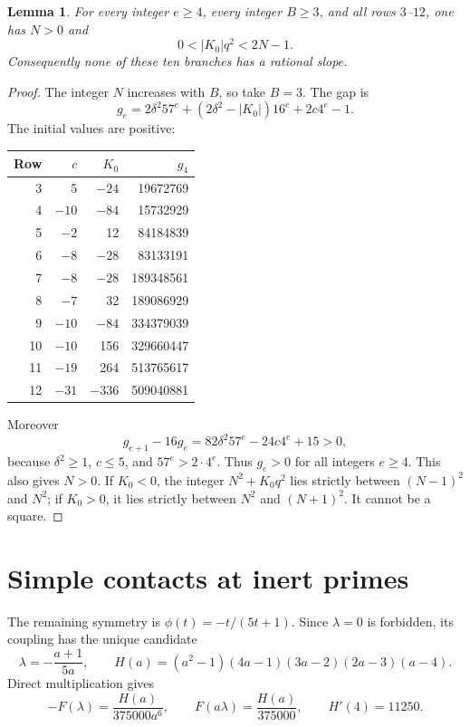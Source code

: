 \documentclass[11pt,a4paper]{article}
\newtheorem{lemma}[theorem]{Lemma}
\begin{document}
\begin{lemma}\label{lem:gap}
For every integer $e\ge4$, every integer $B\ge3$, and all rows
$3$--$12$, one has $N>0$ and
\[
                         0<|K_0|q^2<2N-1.
\]
Consequently none of these ten branches has a rational slope.
\end{lemma}
\begin{proof}
The integer $N$ increases with $B$, so take $B=3$. The gap is
\[
 g_e=2\delta^2 57^e+(2\delta^2-|K_0|)16^e+2c4^e-1.
\]
The initial values are positive:
\begin{center}
\begin{tabular}{rrrr}\toprule
Row&$c$&$K_0$&$g_4$\\\midrule
3&5&$-24$&19672769\\
4&$-10$&$-84$&15732929\\
5&$-2$&12&84184839\\
6&$-8$&$-28$&83133191\\
7&$-8$&$-28$&189348561\\
8&$-7$&32&189086929\\
9&$-10$&$-84$&334379039\\
10&$-10$&156&329660447\\
11&$-19$&264&513765617\\
12&$-31$&$-336$&509040881\\\bottomrule
\end{tabular}
\end{center}
Moreover
\[
        g_{e+1}-16g_e=82\delta^2 57^e-24c4^e+15>0,
\]
because $\delta^2\ge1$, $c\le5$, and $57^e>2\cdot4^e$.
Thus $g_e>0$ for all integers $e\ge4$. This also gives $N>0$.
If $K_0<0$, the integer $N^2+K_0q^2$ lies strictly between
$(N-1)^2$ and $N^2$; if $K_0>0$, it lies strictly between
$N^2$ and $(N+1)^2$. It cannot be a square.
\end{proof}

\section{Simple contacts at inert primes}

The remaining symmetry is $\phi(t)=-t/(5t+1)$. Since $\lambda=0$
is forbidden, its coupling has the unique candidate
\begin{equation}\label{eq:involution}
 \lambda=-\frac{a+1}{5a},\qquad
 H(a)=(a^2-1)(4a-1)(3a-2)(2a-3)(a-4).
\end{equation}
Direct multiplication gives
\begin{equation}\label{eq:H}
             -F(\lambda)=\frac{H(a)}{375000a^6},\qquad
              F(a\lambda)=\frac{H(a)}{375000},\qquad H'(4)=11250.
\end{equation}
\end{document}
